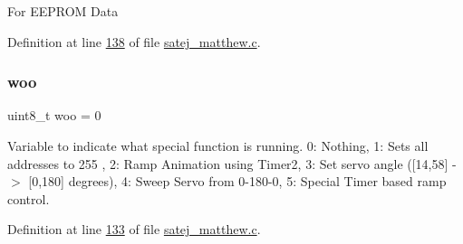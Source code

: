 For E\+E\+P\+R\+OM Data 

Definition at line \mbox{\hyperlink{satej__matthew_8c_source_l00138}{138}} of file \mbox{\hyperlink{satej__matthew_8c_source}{satej\+\_\+matthew.\+c}}.

\mbox{\label{satej__matthew_8c_a45597431413ee9d8b4226bad6151cdc0}} 
\subsubsection{\texorpdfstring{woo}{woo}}
{\footnotesize\ttfamily uint8\+\_\+t woo = 0}

Variable to indicate what special function is running. 0\+: Nothing, 1\+: Sets all addresses to 255 , 2\+: Ramp Animation using Timer2, 3\+: Set servo angle (\mbox{[}14,58\mbox{]} -\/$>$ \mbox{[}0,180\mbox{]} degrees), 4\+: Sweep Servo from 0-\/180-\/0, 5\+: Special Timer based ramp control. 

Definition at line \mbox{\hyperlink{satej__matthew_8c_source_l00133}{133}} of file \mbox{\hyperlink{satej__matthew_8c_source}{satej\+\_\+matthew.\+c}}.

